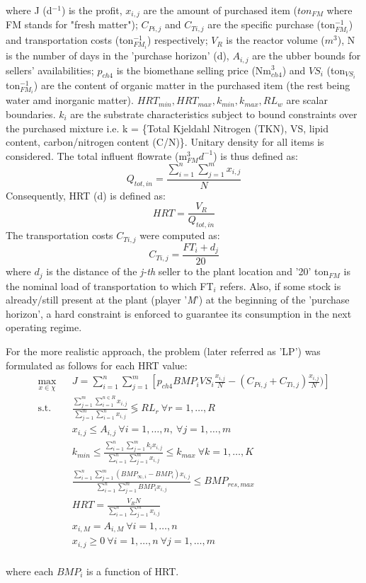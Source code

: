 where J (\texteuro d$^{-1}$) is the profit, $x_{i,j}$ are the amount of purchased item ($ton_{FM}$ where FM stands for "fresh matter"); $C_{Pi,j}$ and $C_{Ti,j}$ are the specific purchase (\texteuro ton$_{FM_{i}}^{-1}$) and transportation costs (\texteuro ton$_{FM_{i}}^{-1}$) respectively; $V_R$ is the reactor volume ($m^3$), N is the number of days in the 'purchase horizon' (d), $A_{i,j}$ are the ubber bounds for sellers' availabilities; $p_{ch4}$ is the biomethane selling price (\texteuro Nm$_{ch4}^3$) and $VS_i$ (ton$_{VS_{i}}$ton$_{FM_{i}}^{-1}$) are the content of organic matter in the purchased item (the rest being water amd inorganic matter). 
$HRT_{min}, HRT_{max}, k_{min}, k_{max}, RL_w$ are scalar boundaries. $k_i$ are the substrate characteristics subject to bound constraints over the purchased mixture i.e. k = \{Total Kjeldahl Nitrogen (TKN), VS, lipid content, carbon/nitrogen content (C/N)\}.
Unitary density for all items is considered.
The total influent flowrate (m$_{FM}^3d^{-1}$) is thus defined as:
\begin{equation}
    Q_{tot,in} = \frac{\sum_{i=1}^{n}\sum_{j=1}^{m}x_{i,j}}{N}
\end{equation}
Consequently, HRT (d) is defined as: 
\begin{equation}
    HRT = \frac{V_R}{Q_{tot,in}}
\end{equation}
The transportation costs $C_{Ti,j}$ were computed as:
\begin{equation}
    C_{Ti,j} = \frac{FT_i + d_j}{20}
\end{equation}
where $d_j$ is the distance of the \emph{j-th} seller to the plant location and '20' ton$_{FM}$ is the nominal load of transportation to which FT$_i$ refers.
Also, if some stock is already/still present at the plant (player '\emph{M}') at the beginning of the 'purchase horizon', a hard constraint is enforced to guarantee its consumption in the next operating regime.

For the more realistic approach, the problem (later referred as 'LP') was formulated as follows for each HRT value:
\begin{eqnarray*}
\max_{x\in\chi}&&J=\sum_{i=1}^{n}\sum_{j=1}^{m} [p_{ch4} BMP_{i} VS_{i} \frac{x_{i,j}}{N} - (C_{Pi,j}+C_{Ti,j})\frac{x_{i,j}}{N})]\\
\mbox{s.t.} && \frac{\sum_{j=1}^{m}\sum_{i=1}^{n\in R} x_{i,j}}{\sum_{j=1}^{m}\sum_{i=1}^{n} x_{i,j}} \lessgtr RL_{r} \ \forall r=1,\dots,R\\
&& x_{i,j} \leq A_{i,j} \ \forall i=1,\dots,n,\ \forall j=1,\dots,m\\
&& k_{min}\leq \frac{\sum_{i=1}^{n}\sum_{j=1}^{m} k_i x_{i,j}}{\sum_{i=1}^{n}\sum_{j=1}^{m} x_{i,j}}\leq k_{max}\ \forall k=1,\dots,K\,\\
&& \frac{\sum_{i=1}^{n}\sum_{j=1}^{m} (BMP_{\infty,i}-BMP_{i}) x_{i,j}}{\sum_{i=1}^{n}\sum_{j=1}^{m} BMP_{i} x_{i,j}}\leq BMP_{res,max}\\\
&& HRT = \frac{V_RN}{\sum_{i=1}^{n}\sum_{j=1}^{m} x_{i,j}}\\
&& x_{i,M} = A_{i,M}\ \forall i=1,\dots,n\\
&& x_{i,j}\geq 0\ \forall i=1,\dots,n\ \forall j=1,\dots,m\\
\end{eqnarray*}

where each $BMP_i$ is a function of HRT.

